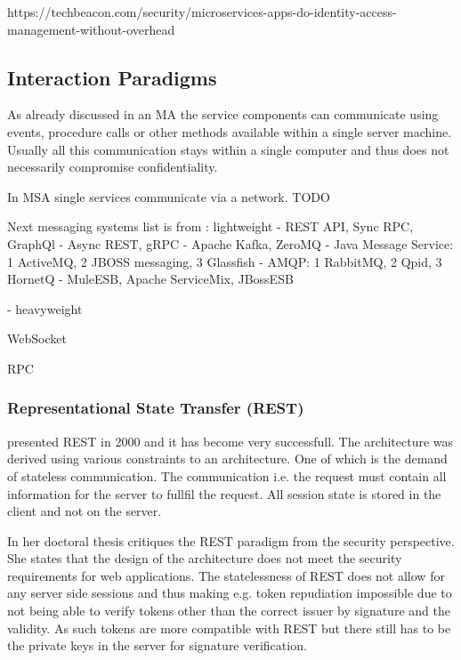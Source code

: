 https://techbeacon.com/security/microservices-apps-do-identity-access-management-without-overhead



\subsection{Interaction Paradigms}
\begin{sloppypar}
    As already discussed in an MA the service components can communicate using 
    events, procedure calls or other methods available within a single server 
    machine. Usually all this communication stays within a single computer and 
    thus does not necessarily compromise confidentiality.
\end{sloppypar}
\begin{sloppypar}
    In MSA single services communicate via a network.
    TODO

    Next messaging systems list is from \citep{secchalmsa}:
lightweight
-
    REST API,
    Sync RPC,
    GraphQl
    -
    Async REST,
    gRPC
    - 
    Apache Kafka,
    ZeroMQ
    -
    Java Message Service:
    1 ActiveMQ,
    2 JBOSS messaging,
    3 Glassfish
    -
    AMQP:
    1 RabbitMQ,
    2 Qpid,
    3 HornetQ
    -
    MuleESB,
    Apache ServiceMix,
    JBossESB


-
heavyweight

    WebSocket
    



\end{sloppypar}

RPC


\subsubsection{Representational State Transfer (REST)}
\begin{sloppypar}
    \citet{restroy} presented REST in 2000 and it has become very successfull. 
    The architecture was derived using various constraints to an architecture.
    One of which is the demand of stateless communication. The communication i.e. 
    the request must contain all information for the server to fullfil the request. 
    All session state is stored in the client and not on the server.
\end{sloppypar}
\begin{sloppypar}
    In her doctoral thesis \citet{secchalmsa} critiques the REST paradigm from 
    the security perspective. She states that the design of the architecture 
    does not meet the security requirements for web applications. The 
    statelessness of REST does not allow for any server side sessions and thus 
    making e.g. token repudiation impossible due to not being able to verify 
    tokens other than the correct issuer by signature and the validity. As such 
    tokens are more compatible with REST but there still has to be the private 
    keys in the server for signature verification.
\end{sloppypar}




